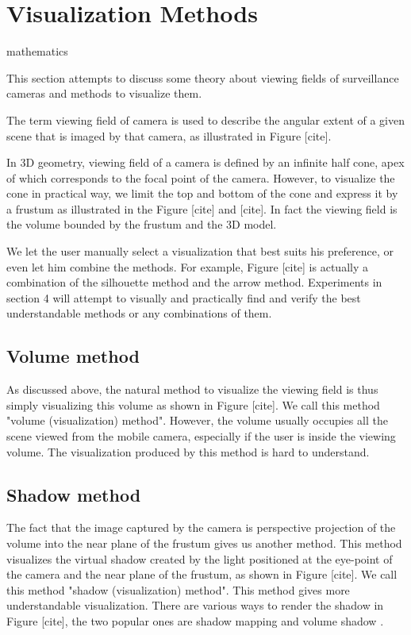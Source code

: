 \chapter{Visualization Methods}
\label{Chapter3}

mathematics

This section attempts to discuss some theory about viewing fields of surveillance cameras and methods to visualize them.

The term viewing field of camera is used to describe the angular extent of a given scene that is imaged by that camera, as illustrated in Figure [cite].

In 3D geometry, viewing field of a camera is defined by an infinite half cone, apex of which corresponds to the focal point of the camera. However, to visualize the cone in practical way, we limit the top and bottom of the cone and express it by a frustum as illustrated in the Figure [cite] and [cite]. In fact the viewing field is the volume bounded by the frustum and the 3D model.

We let the user manually select a visualization that best suits his preference, or even let him combine the methods. For example, Figure [cite] is actually a combination of the silhouette method and the arrow method. Experiments in section 4 will attempt to visually and practically find and verify the best understandable methods or any combinations of them.

\section{Volume method}

As discussed above, the natural method to visualize the viewing field is thus simply visualizing this volume as shown in Figure [cite]. We call this method "volume (visualization) method". However, the volume usually occupies all the scene viewed from the mobile camera, especially if the user is inside the viewing volume. The visualization produced by this method is hard to understand.

\section{Shadow method}

The fact that the image captured by the camera is perspective projection of the volume into the near plane of the frustum gives us another method. This method visualizes the virtual shadow created by the light positioned at the eye-point of the camera and the near plane of the frustum, as shown in Figure [cite]. We call this method "shadow (visualization) method". This method gives more understandable visualization. There are various ways to render the shadow in Figure [cite], the two popular ones are shadow mapping \citep{Reference7} \citep{Reference8} and volume shadow \citep{Reference9}.


